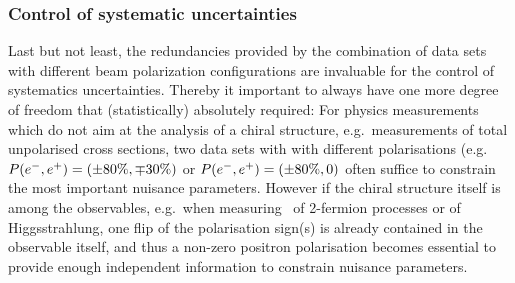 
\subsubsection{Control of systematic uncertainties} 
\label{subsubsec:pol:systematics}

Last but not least, the redundancies provided by the combination of data sets with different beam polarization configurations are invaluable for the control of systematics uncertainties. Thereby it important to always have one more degree of freedom that (statistically) absolutely required: For physics measurements which do not aim at the analysis of a chiral structure, e.g.\ measurements of total unpolarised cross sections, two data sets with with different polarisations (e.g.\ $P(e^-,e^+)=(\pm 80\%, \mp 30\%)$ or $P(e^-,e^+)=(\pm 80\%, 0)$ often suffice to constrain the most important nuisance parameters. However if the chiral structure itself is among the observables, e.g.\ when measuring \ALR\ of 2-fermion processes or of Higgsstrahlung, one flip of the polarisation sign(s) is already contained in the observable itself, and thus a non-zero positron polarisation becomes essential to provide enough independent information to constrain nuisance parameters.

